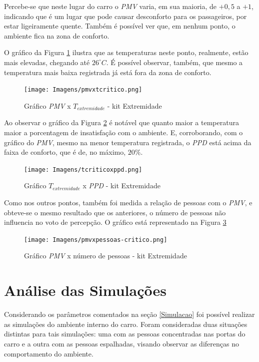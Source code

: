\documentclass[acronym,symbols,table]{fei}
\begin{document}
Percebe-se que neste lugar do carro o \textit{PMV} varia, em sua maioria, de $+0,5$ a $+1$, indicando que é um lugar que pode causar desconforto para os passageiros, por estar ligeiramente quente. Também é possível ver que, em nenhum ponto, o ambiente fica na zona de conforto.

O gráfico da Figura \ref{fig:tcritico-pmv} ilustra que as temperaturas neste ponto, realmente, estão mais elevadas, chegando até $26^\circ C$. É possível observar, também, que mesmo a temperatura mais baixa registrada já está fora da zona de conforto.

\begin{figure}[!htb]
    \centering
    \caption{Gráfico \textit{PMV} x $T_{extremidade}$ - kit Extremidade}
    \texttt{[image: Imagens/pmvxtcritico.png]}
    \label{fig:tcritico-pmv}
\end{figure}

 Ao observar o gráfico da Figura \ref{fig:tcritico-ppd} é notável que quanto maior a temperatura maior a porcentagem de insatisfação com o ambiente. E, corroborando, com o gráfico do \textit{PMV}, mesmo na menor temperatura registrada, o \textit{PPD} está acima da faixa de conforto, que é de, no máximo, $20\%$.

\begin{figure}[!htb]
    \centering
    \caption{Gráfico $T_{extremidade}$ x \textit{PPD} - kit Extremidade}
    \texttt{[image: Imagens/tcriticoxppd.png]}
    \label{fig:tcritico-ppd}
\end{figure}

\newpage
Como nos outros pontos, também foi medida a relação de pessoas com o \textit{PMV}, e obteve-se o mesmo resultado que os anteriores, o número de pessoas não influencia no voto de percepção. O gráfico está representado na Figura \ref{fig:pmvxpessoas-tcritico} 

\begin{figure}[!htb]
    \centering
    \caption{Gráfico \textit{PMV} x número de pessoas - kit Extremidade}
    \texttt{[image: Imagens/pmvxpessoas-critico.png]}
    \label{fig:pmvxpessoas-tcritico}
\end{figure}


\section{Análise das Simulações}

Considerando os parâmetros comentados na seção \ref{Simulacao} foi possível realizar as simulações do ambiente interno do carro. Foram consideradas duas situações distintas para tais simulações: uma com as pessoas concentradas nas portas do carro e a outra com as pessoas espalhadas, visando observar as diferenças no comportamento do ambiente. 
\end{document}
